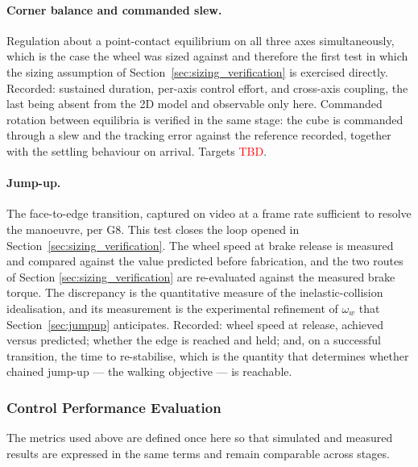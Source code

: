 \paragraph{Corner balance and commanded slew.}
\label{sec:test_corner}
Regulation about a point-contact equilibrium on all three axes simultaneously,
which is the case the wheel was sized against and therefore the first test in
which the sizing assumption of Section~\ref{sec:sizing_verification} is
exercised directly. Recorded: sustained duration, per-axis control effort, and
cross-axis coupling, the last being absent from the 2D model and observable
only here.
\label{sec:test_slew}
Commanded rotation between equilibria is verified in the same stage: the cube is
commanded through a slew and the tracking error against the reference recorded,
together with the settling behaviour on arrival. Targets \textcolor{red}{TBD}.

\paragraph{Jump-up.}
\label{sec:test_jumpup}
The face-to-edge transition,
captured on video at a frame rate sufficient to resolve the manoeuvre, per G8.
This test closes the loop opened in Section~\ref{sec:sizing_verification}. The
wheel speed at brake release is measured and compared against the value
predicted before fabrication, and the two routes of Section
\ref{sec:sizing_verification} are re-evaluated against the measured brake
torque. The discrepancy is the quantitative measure of the inelastic-collision
idealisation, and its measurement is the experimental refinement of $\omega_w$
that Section~\ref{sec:jumpup} anticipates. Recorded: wheel speed at release,
achieved versus predicted; whether the edge is reached and held; and, on a
successful transition, the time to re-stabilise, which is the quantity that
determines whether chained jump-up --- the walking objective --- is reachable.

\subsubsection{Control Performance Evaluation}
\label{sec:test_perf}

The metrics used above are defined once here so that simulated and measured
results are expressed in the same terms and remain comparable across stages.

